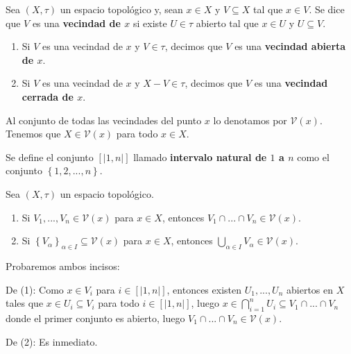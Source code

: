\documentclass[12pt]{report}
\theoremstyle{largebreak}
\newcommand{\V}[1]{\ensuremath{\mathcal{V}(#1)}}
\newcommand{\natint}[1]{\ensuremath{\left[|#1|\right]}}
\begin{document}
    \begin{mydef}
        Sea $(X,\tau)$ un espacio topológico y, sean $x\in X$ y $V\subseteq X$ tal que $x\in V$. Se dice que $V$ es una \textbf{vecindad de $x$} si existe $U\in\tau$ abierto tal que $x\in U$ y $U\subseteq V$.
        \begin{enumerate}
            \item Si $V$ es una vecindad de $x$ y $V\in\tau$, decimos que $V$ es una \textbf{vecindad abierta de $x$}.
            \item Si $V$ es una vecindad de $x$ y $X-V\in\tau$, decimos que $V$ es una \textbf{vecindad cerrada de $x$}.
        \end{enumerate}
        Al conjunto de todas las vecindades del punto $x$ lo denotamos por $\mathcal{V}(x)$. Tenemos que $X\in\mathcal{V}(x)$ para todo $x\in X$.
    \end{mydef}

    \begin{mydef}
        Se define el conjunto $\natint{1,n}$ llamado \textbf{intervalo natural de $1$ a $n$} como el conjunto $\left\{1,2,...,n\right\}$.
    \end{mydef}
        
    \begin{excer}
        Sea $(X,\tau)$ un espacio topológico.
        \begin{enumerate}
            \item Si $V_1,...,V_n\in\mathcal{V}(x)$ para $x\in X$, entonces $V_1\cap...\cap V_n\in\mathcal{V}(x)$.
            \item Si $\left\{V_\alpha\right\}_{\alpha\in I}\subseteq\mathcal{V}(x)$ para $x\in X$, entonces $\bigcup_{\alpha\in I}V_\alpha\in\mathcal{V}(x)$.
        \end{enumerate}
    \end{excer}

    \begin{sol}
        Probaremos ambos incisos:
        
        De (1): Como $x\in V_i$ para $i\in\natint{1,n}$, entonces existen $U_1,...,U_n$ abiertos en $X$ tales que $x\in U_i\subseteq V_i$ para todo $i\in\natint{1,n}$, luego $x\in\bigcap_{i=1}^n U_i\subseteq V_1\cap...\cap V_n$ donde el primer conjunto es abierto, luego $V_1\cap...\cap V_n\in\V{x}$.

        De (2): Es inmediato.
    \end{sol}
\end{document}

